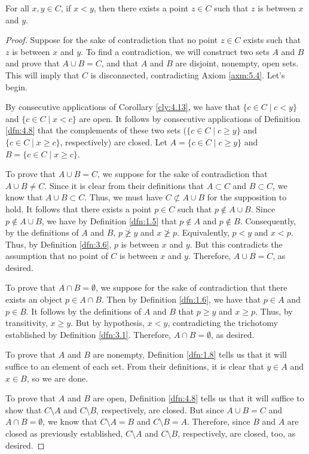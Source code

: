 \documentclass[../main.tex]{subfiles}
\begin{document}
\begin{theorem}\label{trm:5.2}
    For all $x,y\in C$, if $x<y$, then there exists a point $z\in C$ such that $z$ is between $x$ and $y$.
    \begin{proof}
        Suppose for the sake of contradiction that no point $z\in C$ exists such that $z$ is between $x$ and $y$. To find a contradiction, we will construct two sets $A$ and $B$ and prove that $A\cup B=C$, and that $A$ and $B$ are disjoint, nonempty, open sets. This will imply that $C$ is disconnected, contradicting Axiom \ref{axm:5.4}. Let's begin.\par
        By consecutive applications of Corollary \ref{cly:4.13}, we have that $\{c\in C\mid c<y\}$ and $\{c\in C\mid x<c\}$ are open. It follows by consecutive applications of Definition \ref{dfn:4.8} that the complements of these two sets ($\{c\in C\mid c\geq y\}$ and $\{c\in C\mid x\geq c\}$, respectively) are closed. Let $A=\{c\in C\mid c\geq y\}$ and $B=\{c\in C\mid x\geq c\}$.\par
        To prove that $A\cup B=C$, we suppose for the sake of contradiction that $A\cup B\neq C$. Since it is clear from their definitions that $A\subset C$ and $B\subset C$, we know that $A\cup B\subset C$. Thus, we must have $C\not\subset A\cup B$ for the supposition to hold. It follows that there exists a point $p\in C$ such that $p\notin A\cup B$. Since $p\notin A\cup B$, we have by Definition \ref{dfn:1.5} that $p\notin A$ and $p\notin B$. Consequently, by the definitions of $A$ and $B$, $p\ngeq y$ and $x\ngeq p$. Equivalently, $p<y$ and $x<p$. Thus, by Definition \ref{dfn:3.6}, $p$ is between $x$ and $y$. But this contradicts the assumption that no point of $C$ is between $x$ and $y$. Therefore, $A\cup B=C$, as desired.\par
        To prove that $A\cap B=\emptyset$, we suppose for the sake of contradiction that there exists an object $p\in A\cap B$. Then by Definition \ref{dfn:1.6}, we have that $p\in A$ and $p\in B$. It follows by the definitions of $A$ and $B$ that $p\geq y$ and $x\geq p$. Thus, by transitivity, $x\geq y$. But by hypothesis, $x<y$, contradicting the trichotomy established by Definition \ref{dfn:3.1}. Therefore, $A\cap B=\emptyset$, as desired.\par
        To prove that $A$ and $B$ are nonempty, Definition \ref{dfn:1.8} tells us that it will suffice to an element of each set. From their definitions, it is clear that $y\in A$ and $x\in B$, so we are done.\par
        To prove that $A$ and $B$ are open, Definition \ref{dfn:4.8} tells us that it will suffice to show that $C\setminus A$ and $C\setminus B$, respectively, are closed. But since $A\cup B=C$ and $A\cap B=\emptyset$, we know that $C\setminus A=B$ and $C\setminus B=A$. Therefore, since $B$ and $A$ are closed as previously established, $C\setminus A$ and $C\setminus B$, respectively, are closed, too, as desired.\par

\end{proof}
\end{theorem}
\end{document}
